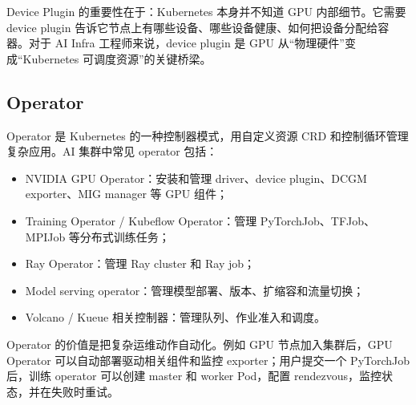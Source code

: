 Device Plugin 的重要性在于：Kubernetes 本身并不知道 GPU 内部细节。它需要 device plugin 告诉它节点上有哪些设备、哪些设备健康、如何把设备分配给容器。对于 AI Infra 工程师来说，device plugin 是 GPU 从“物理硬件”变成“Kubernetes 可调度资源”的关键桥梁。

\subsection{Operator}
\label{subsec:operator}

Operator 是 Kubernetes 的一种控制器模式，用自定义资源 CRD 和控制循环管理复杂应用。AI 集群中常见 operator 包括：

\begin{itemize}
  \item NVIDIA GPU Operator：安装和管理 driver、device plugin、DCGM exporter、MIG manager 等 GPU 组件；
  \item Training Operator / Kubeflow Operator：管理 PyTorchJob、TFJob、MPIJob 等分布式训练任务；
  \item Ray Operator：管理 Ray cluster 和 Ray job；
  \item Model serving operator：管理模型部署、版本、扩缩容和流量切换；
  \item Volcano / Kueue 相关控制器：管理队列、作业准入和调度。
\end{itemize}

Operator 的价值是把复杂运维动作自动化。例如 GPU 节点加入集群后，GPU Operator 可以自动部署驱动相关组件和监控 exporter；用户提交一个 PyTorchJob 后，训练 operator 可以创建 master 和 worker Pod，配置 rendezvous，监控状态，并在失败时重试。


